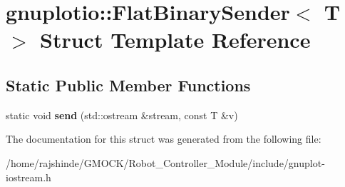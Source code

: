 \hypertarget{structgnuplotio_1_1_flat_binary_sender}{}\section{gnuplotio\+:\+:Flat\+Binary\+Sender$<$ T $>$ Struct Template Reference}
\label{structgnuplotio_1_1_flat_binary_sender}
\subsection*{Static Public Member Functions}
\begin{DoxyCompactItemize}
\item 
static void {\bfseries send} (std\+::ostream \&stream, const T \&v)\hypertarget{structgnuplotio_1_1_flat_binary_sender_a24d085492f2539c14033cd5c6ba75ba5}{}\label{structgnuplotio_1_1_flat_binary_sender_a24d085492f2539c14033cd5c6ba75ba5}

\end{DoxyCompactItemize}


The documentation for this struct was generated from the following file\+:\begin{DoxyCompactItemize}
\item 
/home/rajshinde/\+G\+M\+O\+C\+K/\+Robot\+\_\+\+Controller\+\_\+\+Module/include/gnuplot-\/iostream.\+h\end{DoxyCompactItemize}
